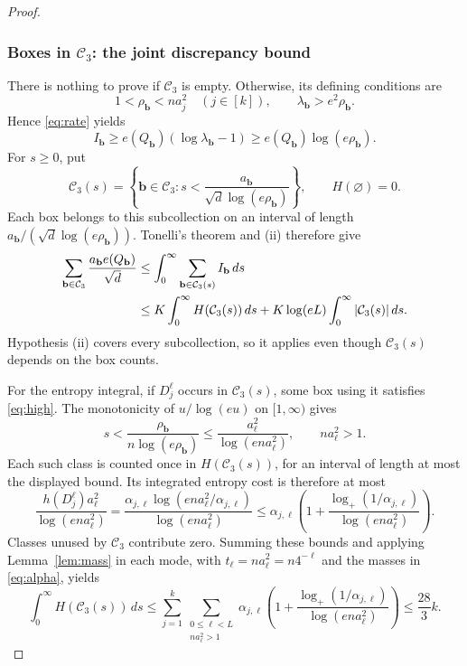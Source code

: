 \documentclass[10pt,a4paper]{amsart}
\numberwithin{equation}{section}
\begin{document}
\begin{proof}
\subsubsection*{Boxes in $\mathcal C_3$: the joint discrepancy bound}
There is nothing to prove if $\mathcal C_3$ is empty. Otherwise,
its defining conditions are
\begin{equation}\label{eq:high}
 1<\rho_{\mathbf b}<na_j^2\quad(j\in[k]),\qquad
 \lambda_{\mathbf b}>e^2\rho_{\mathbf b}.
\end{equation}
Hence \eqref{eq:rate} yields
\[
 I_{\mathbf b}\ge e(Q_{\mathbf b})(\log\lambda_{\mathbf b}-1)
               \ge e(Q_{\mathbf b})\log(e\rho_{\mathbf b}).
\]
For $s\ge0$, put
\[
 \mathcal C_3(s)=\left\{\mathbf b\in\mathcal C_3:
        s<\frac{a_{\mathbf b}}{\sqrt d\log(e\rho_{\mathbf b})}\right\},
 \qquad H(\varnothing)=0.
\]
Each box belongs to this subcollection on an interval of length
$a_{\mathbf b}/(\sqrt d\log(e\rho_{\mathbf b}))$.
Tonelli's theorem and \textup{(ii)} therefore give
\begin{align}
 \sum_{\mathbf b\in\mathcal C_3}\frac{a_{\mathbf b}e(Q_{\mathbf b})}{\sqrt d}
 &\le\int_0^\infty\sum_{\mathbf b\in\mathcal C_3(s)}I_{\mathbf b}\,ds
 \notag\\
 &\le K\int_0^\infty H(\mathcal C_3(s))\,ds
       +K\log(eL)\int_0^\infty|\mathcal C_3(s)|\,ds.
 \label{eq:high-integrated}
\end{align}
Hypothesis \textup{(ii)} covers every subcollection, so it applies
even though $\mathcal C_3(s)$ depends on the box counts.

For the entropy integral, if $D_j^\ell$ occurs in $\mathcal C_3(s)$,
some box using it satisfies \eqref{eq:high}. The monotonicity of
$u/\log(eu)$ on $[1,\infty)$ gives
\[
 s<\frac{\rho_{\mathbf b}}{n\log(e\rho_{\mathbf b})}
 \le\frac{a_\ell^2}{\log(en a_\ell^2)},\qquad na_\ell^2>1.
\]
Each such class is counted once in $H(\mathcal C_3(s))$, for an
interval of length at most the displayed bound. Its integrated
entropy cost is therefore at most
\[
 \frac{h(D_j^\ell)a_\ell^2}{\log(en a_\ell^2)}
 =\frac{\alpha_{j,\ell}\log(en a_\ell^2/\alpha_{j,\ell})}
          {\log(en a_\ell^2)}
 \le\alpha_{j,\ell}\left(1+
       \frac{\log_+(1/\alpha_{j,\ell})}{\log(en a_\ell^2)}\right).
\]
Classes unused by $\mathcal C_3$ contribute zero.
Summing these bounds and applying Lemma~\ref{lem:mass} in each mode,
with $t_\ell=na_\ell^2=n4^{-\ell}$ and the masses in \eqref{eq:alpha},
yields
\begin{equation}\label{eq:total-entropy-charge}
 \int_0^\infty H(\mathcal C_3(s))\,ds
 \le\sum_{j=1}^k\sum_{\substack{0\le\ell<L\\na_\ell^2>1}}
       \alpha_{j,\ell}\left(1+
       \frac{\log_+(1/\alpha_{j,\ell})}{\log(en a_\ell^2)}\right)
 \le\frac{28}{3}k.
\end{equation}


\end{proof}
\end{document}
